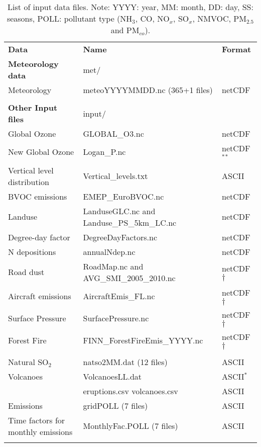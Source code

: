 \begin{table}
\caption[List of input data files]{List of input data files.
Note: YYYY: year, MM: month, DD: day, SS: seasons, POLL: pollutant
type (NH$_3$, CO, NO$_x$, SO$_x$, NMVOC,
PM$_{2.5}$ and PM$_{co}$). 
\label{Tab:inputdata}}
\begin{center}
\begin{small}
\begin{tabular}{lll}
\hline
{\bf Data} &  {\bf Name} & {\bf Format}\\
{\bf Meteorology data} & met/&  \\
Meteorology  &  meteoYYYYMMDD.nc \quad (365+1 files) & netCDF\\
& & \\
{\bf Other Input files} & input/ &\\
Global Ozone & GLOBAL\_O3.nc & netCDF\\
New Global Ozone & Logan\_P.nc & netCDF $^*$$^*$\\
Vertical level distribution & Vertical\_levels.txt & ASCII\\
BVOC emissions & EMEP\_EuroBVOC.nc & netCDF\\
Landuse & LanduseGLC.nc and Landuse\_PS\_5km\_LC.nc  & netCDF\\
Degree-day factor & DegreeDayFactors.nc &  netCDF\\
N depositions & annualNdep.nc  & netCDF\\
Road dust &  RoadMap.nc and AVG\_SMI\_2005\_2010.nc& netCDF$\dagger$ \\
Aircraft emissions & AircraftEmis\_FL.nc & netCDF$\dagger$ \\
Surface Pressure & SurfacePressure.nc & netCDF$\dagger$ \\
Forest Fire & FINN\_ForestFireEmis\_YYYY.nc & netCDF$\dagger$ \\
& & \\
Natural SO$_2$ & natso2MM.dat  \quad (12 files) & ASCII\\
Volcanoes & VolcanoesLL.dat & ASCII$^*$\\
	  & eruptions.csv volcanoes.csv& ASCII \\ 
Emissions & gridPOLL  \quad (7 files) & ASCII\\
Time factors for monthly emissions& MonthlyFac.POLL  \quad (7 files) & ASCII\\
$$
\end{tabular}
\end{small}
\end{center}
\end{table}
